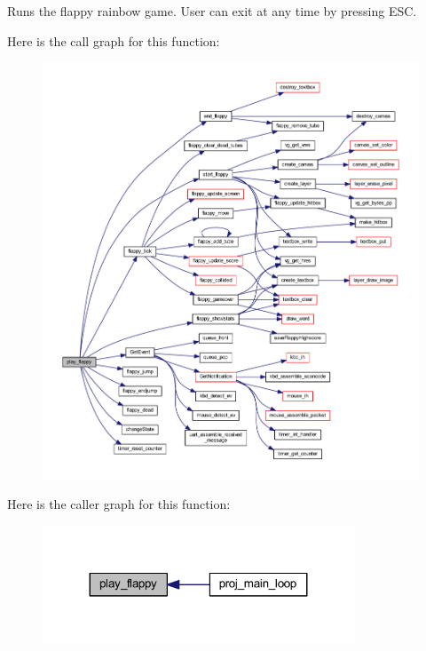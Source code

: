 Runs the flappy rainbow game. User can exit at any time by pressing E\+SC. 

Here is the call graph for this function\+:\nopagebreak
\begin{figure}[H]
\begin{center}
\leavevmode
\includegraphics[width=350pt]{group__pengoo_ga2ef126f11a398bb34f581d5eca368e6b_cgraph}
\end{center}
\end{figure}
Here is the caller graph for this function\+:\nopagebreak
\begin{figure}[H]
\begin{center}
\leavevmode
\includegraphics[width=263pt]{group__pengoo_ga2ef126f11a398bb34f581d5eca368e6b_icgraph}
\end{center}
\end{figure}
\mbox{\label{group__pengoo_gab63f8a21d8bd92b9f638151a9912fa84}} 
